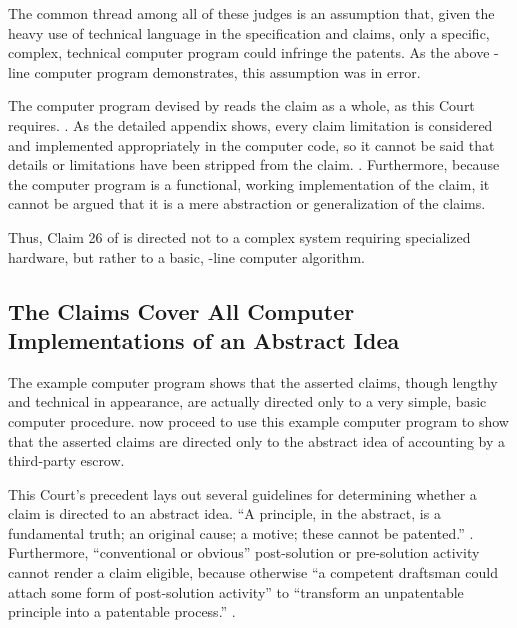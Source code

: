 \documentclass{scotus}
\begin{document}
The common thread among all of these judges is an assumption that, given the
heavy use of technical language in the specification and claims, only a
specific, complex, technical computer program could infringe the patents. As the
above \numlines-line computer program demonstrates, this assumption was in
error.

The computer program devised by \amici reads
the claim as a whole, as this Court requires. . As
the detailed appendix shows, every
claim limitation is considered and implemented appropriately in the
computer code, so it cannot be said that details or limitations have been
stripped from the claim. . Furthermore,
because
the computer program is a functional, working implementation of the claim, it
cannot be argued that it is a mere abstraction or generalization of the claims.

Thus, Claim 26 of  is directed not to a complex
system requiring specialized hardware, but rather to a basic,
\numlines-line computer algorithm.


%
%
\subsection{The Claims Cover All
Computer Implementations of an Abstract Idea}

The example computer program shows that the asserted claims, though lengthy and
technical in appearance, are actually directed only to a very simple, basic
computer procedure. \Amici now proceed to use this example computer program to
show that the asserted claims are directed only to the abstract idea of
accounting by a third-party escrow.

This Court's precedent lays out several guidelines for determining whether a
claim is directed to an abstract idea.
``A principle, in the abstract, is a fundamental truth; an original cause; a
motive; these cannot be patented.''
.
Furthermore, ``conventional or
obvious''
post-solution or pre-solution activity cannot
render a claim eligible, because otherwise
``a competent draftsman could attach some form of post-solution activity'' to
``transform an unpatentable principle into a patentable process.''
.
\end{document}

